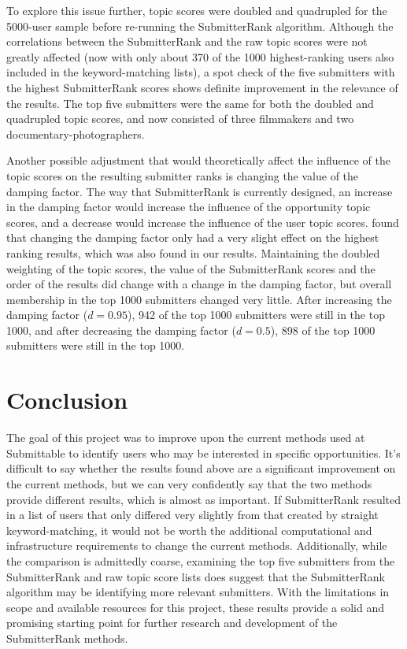 \documentclass[]{report}   %
\begin{document}
To explore this issue further, topic scores were doubled and quadrupled for the 5000-user sample before re-running the SubmitterRank algorithm. Although the correlations between the SubmitterRank and the raw topic scores were not greatly affected (now with only about 370 of the 1000 highest-ranking users also included in the keyword-matching lists), a spot check of the five submitters with the highest SubmitterRank scores shows definite improvement in the relevance of the results. The top five submitters were the same for both the doubled and quadrupled topic scores, and now consisted of three filmmakers and two documentary-photographers. 

Another possible adjustment that would theoretically affect the influence of the topic scores on the resulting submitter ranks is changing the value of the damping factor. The way that SubmitterRank is currently designed, an increase in the damping factor would increase the influence of the opportunity topic scores, and a decrease would increase the influence of the user topic scores.  found that changing the damping factor only had a very slight effect on the highest ranking results, which was also found in our results. Maintaining the doubled weighting of the topic scores, the value of the SubmitterRank scores and the order of the results did change with a change in the damping factor, but overall membership in the top 1000 submitters changed very little. After increasing the damping factor ($d = 0.95$), 942 of the top 1000 submitters were still in the top 1000, and after decreasing the damping factor ($d = 0.5$), 898 of the top 1000 submitters were still in the top 1000.

\chapter{Conclusion} 

The goal of this project was to improve upon the current methods used at Submittable to identify users who may be interested in specific opportunities. It's difficult to say whether the results found above are a significant improvement on the current methods, but we can very confidently say that the two methods provide different results, which is almost as important. If SubmitterRank resulted in a list of users that only differed very slightly from that created by straight keyword-matching, it would not be worth the additional computational and infrastructure requirements to change the current methods. Additionally, while the comparison is admittedly coarse, examining the top five submitters from the SubmitterRank and raw topic score lists does suggest that the SubmitterRank algorithm may be identifying more relevant submitters. With the limitations in scope and available resources for this project, these results provide a solid and promising starting point for further research and development of the SubmitterRank methods.
\end{document}
